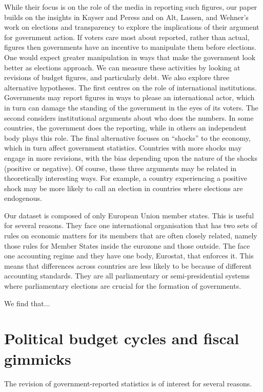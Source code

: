 \documentclass[]{article}
\begin{document}
While their focus is on the role of the media in reporting such figures, our paper builds on the insights in Kayser and Peress and on Alt, Lassen, and Wehner’s work on elections and transparency to explore the implications of their argument for government action. If voters care most about reported, rather than actual, figures then governments have an incentive to manipulate them before elections. One would expect greater manipulation in ways that make the government look better as elections approach. We can measure these activities by looking at revisions of budget figures, and particularly debt. We also explore three alternative hypotheses. The first centres on the role of international institutions. Governments may report figures in ways to please an international actor, which in turn can damage the standing of the government in the eyes of its voters. The second considers institutional arguments about who does the numbers. In some countries, the government does the reporting, while in others an independent body plays this role. The final alternative focuses on “shocks” to the economy, which in turn affect government statistics. Countries with more shocks may engage in more revisions, with the bias depending upon the nature of the shocks (positive or negative). Of course, these three arguments may be related in theoretically interesting ways. For example, a country experiencing a positive shock may be more likely to call an election in countries where elections are endogenous.

Our dataset is composed of only European Union member states. This is useful for several reasons. They face one international organisation that has two sets of rules on economic matters for its members that are often closely related, namely those rules for Member States inside the eurozone and those outside. The face one accounting regime and they have one body, Eurostat, that enforces it. This means that differences across countries are less likely to be because of different accounting standards. They are all parliamentary or semi-presidential systems where parliamentary elections are crucial for the formation of governments.

We find that...

\section{Political budget cycles and fiscal gimmicks}

The revision of government-reported statistics is of interest for several reasons.
\end{document}
